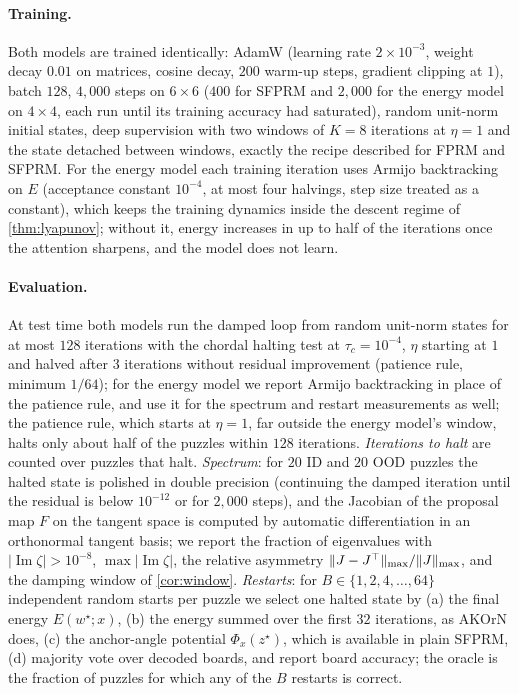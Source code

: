 \paragraph{Training.}
Both models are trained identically: AdamW (learning rate $2\times10^{-3}$, weight decay $0.01$ on
matrices, cosine decay, $200$ warm-up steps, gradient clipping at $1$), batch $128$,
$4{,}000$ steps on $6\times6$ ($400$ for SFPRM and $2{,}000$ for the energy model on $4\times4$,
each run until its training accuracy had saturated), random unit-norm initial states, deep supervision with two windows of $K=8$ iterations at $\eta=1$
and the state detached between windows, exactly the recipe described for FPRM and SFPRM. For the
energy model each training iteration uses Armijo backtracking on $E$ (acceptance constant
$10^{-4}$, at most four halvings, step size treated as a constant), which keeps the training
dynamics inside the descent regime of \cref{thm:lyapunov}; without it, energy increases in up to
half of the iterations once the attention sharpens, and the model does not learn.

\paragraph{Evaluation.}
At test time both models run the damped loop from random unit-norm states for at most $128$
iterations with the chordal halting test at $\tau_c=10^{-4}$, $\eta$ starting at $1$ and halved
after $3$ iterations without residual improvement (patience rule, minimum $1/64$); for the energy
model we report Armijo backtracking in place of the patience rule, and use it for the spectrum and
restart measurements as well; the patience rule, which starts at $\eta=1$, far outside the energy
model's window, halts only about half of the puzzles within $128$ iterations. \emph{Iterations to halt}
are counted over puzzles that halt. \emph{Spectrum}: for $20$ ID and $20$ OOD puzzles the halted
state is polished in double precision (continuing the damped iteration until the residual is below
$10^{-12}$ or for $2{,}000$ steps), and the Jacobian of the proposal map $F$ on the tangent space
is computed by automatic differentiation in an orthonormal tangent basis; we report the fraction of
eigenvalues with $|\operatorname{Im}\zeta|>10^{-8}$, $\max|\operatorname{Im}\zeta|$, the relative
asymmetry $\lVert J-J^\top\rVert_{\max}/\lVert J\rVert_{\max}$, and the damping window of \cref{cor:window}.
\emph{Restarts}: for $B\in\{1,2,4,\dots,64\}$ independent random starts per puzzle we select one
halted state by (a) the final energy $E(w^\star;x)$, (b) the energy summed over the first $32$
iterations, as AKOrN does, (c) the anchor-angle potential $\Phi_x(z^\star)$, which is available in
plain SFPRM, (d) majority vote over decoded boards, and report board accuracy; the oracle is the
fraction of puzzles for which any of the $B$ restarts is correct.

